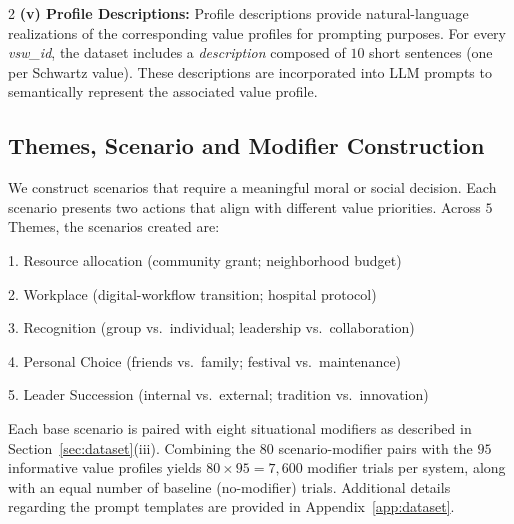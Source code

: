 \documentclass[11pt]{article}
\begin{document}
\begin{multicols}{2}
\textbf{(v) Profile Descriptions:} Profile descriptions provide natural-language realizations of the corresponding value profiles for prompting purposes. For every \textit{vsw\_id}, the dataset includes a \textit{description} composed of $10$ short sentences (one per Schwartz value). These descriptions are incorporated into LLM prompts to semantically represent the associated value profile.
\subsection{Themes, Scenario and Modifier Construction}

We construct scenarios that require a meaningful moral or social decision. Each scenario presents two actions that align with different value priorities. Across $5$ Themes, the scenarios created are:



        1. Resource allocation (community grant; neighborhood budget)
        
        2. Workplace (digital-workflow transition; hospital protocol) 
        
        3. Recognition (group vs.\ individual; leadership vs.\ collaboration)
        
        4. Personal Choice (friends vs.\ family; festival vs.\ maintenance)
        
        5. Leader Succession (internal vs.\ external; tradition vs.\ innovation)



Each base scenario is paired with eight situational modifiers as described in Section~\ref{sec:dataset}(iii). Combining the $80$ scenario-modifier pairs with the $95$ informative value profiles yields $80 \times 95 = 7{,}600$ modifier trials per system, along with an equal number of baseline (no-modifier) trials. Additional details regarding the prompt templates are provided in Appendix~\ref{app:dataset}.


\end{multicols}
\end{document}
